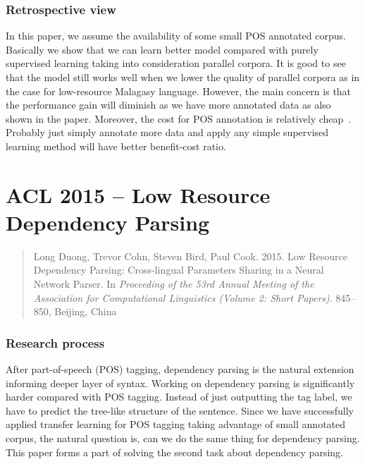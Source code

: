 \documentclass[12pt,twoside,final,hidelinks]{ltthesis}
\theoremstyle{definition}
\begin{document}
\subsubsection{Retrospective view}
In this paper, we assume the availability of some small POS annotated corpus. Basically we show that we can learn better model compared with purely 
supervised learning taking into consideration parallel corpora. It is good to see that the model still works well when we lower the quality of parallel 
corpora as in the case for low-resource Malagasy language. However, the main concern is that the performance gain will diminish as we have more annotated 
data as also shown in the paper. Moreover, the cost for POS annotation is relatively cheap~\cite{garrette:naacl13}. Probably just simply annotate more data and 
apply any simple supervised learning method will have better benefit-cost ratio. 

%




\section{ACL 2015 -- Low Resource Dependency Parsing}
\label{sec:acl15}

\begin{quote}
Long Duong, Trevor Cohn, Steven Bird, Paul Cook. 2015. Low Resource Dependency Parsing: Cross-lingual Parameters Sharing in a Neural Network Parser. In\textit{ Proceeding of the 53rd Annual Meeting of the Association for Computational Linguistics (Volume 2: Short Papers)}.  845--850, Beijing, China
\end{quote}
\subsubsection{Research process}
After part-of-speech (POS) tagging, dependency parsing is the natural extension informing deeper layer of syntax. Working on dependency parsing is significantly 
harder compared with POS tagging. Instead of just outputting the tag label, we have to predict the tree-like structure of the sentence. Since we have successfully 
applied transfer learning for POS tagging taking advantage of small annotated corpus, the natural question is, can we do the same thing for dependency 
parsing. This paper forms a part of solving the second task about dependency parsing. 
\end{document}
